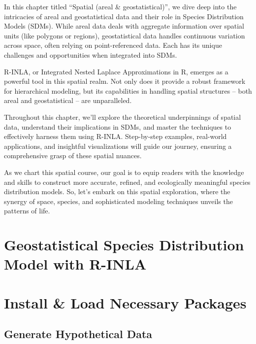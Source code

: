 \documentclass[
]{krantz}
\begin{document}
In this chapter titled ``Spatial (areal \& geostatistical)'', we dive deep into the intricacies of areal and geostatistical data and their role in Species Distribution Models (SDMs). While areal data deals with aggregate information over spatial units (like polygons or regions), geostatistical data handles continuous variation across space, often relying on point-referenced data. Each has its unique challenges and opportunities when integrated into SDMs.

R-INLA, or Integrated Nested Laplace Approximations in R, emerges as a powerful tool in this spatial realm. Not only does it provide a robust framework for hierarchical modeling, but its capabilities in handling spatial structures -- both areal and geostatistical -- are unparalleled.

Throughout this chapter, we'll explore the theoretical underpinnings of spatial data, understand their implications in SDMs, and master the techniques to effectively harness them using R-INLA. Step-by-step examples, real-world applications, and insightful visualizations will guide our journey, ensuring a comprehensive grasp of these spatial nuances.

As we chart this spatial course, our goal is to equip readers with the knowledge and skills to construct more accurate, refined, and ecologically meaningful species distribution models. So, let's embark on this spatial exploration, where the synergy of space, species, and sophisticated modeling techniques unveils the patterns of life.

\hypertarget{geostatistical-species-distribution-model-with-r-inla}{%
\section{Geostatistical Species Distribution Model with R-INLA}\label{geostatistical-species-distribution-model-with-r-inla}}

\hypertarget{install-load-necessary-packages}{%
\section{Install \& Load Necessary Packages}\label{install-load-necessary-packages}}

\hypertarget{generate-hypothetical-data}{%
\subsection{Generate Hypothetical Data}\label{generate-hypothetical-data}}
\end{document}
